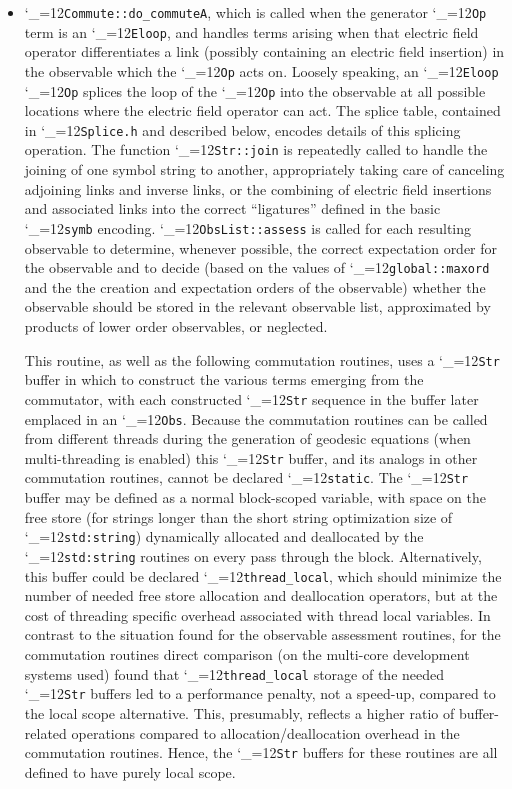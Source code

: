 \documentclass [12pt]{article}
\makeatletter
\renewcommand{\tt}{\begingroup\catcode`_=12\def\_{\string_}\tt@}
\newcommand{\tt@}[1]{\texttt{#1}\endgroup}
\makeatother
\begin{document}
\begin{itemize}
\item
    \tt{Commute::do_commuteA}, which is called when the
    generator \tt{Op} term is an \tt{Eloop}, and
    handles terms arising when that electric field operator
    differentiates a link (possibly containing an electric
    field insertion) in the
    observable which the \tt{Op} acts on.
    Loosely speaking, an \tt{Eloop} \tt{Op} splices
    the loop of the \tt{Op} into the observable at all
    possible locations where the electric field operator
    can act.
    The splice table, contained in \tt{Splice.h} and
    described below, encodes details of this splicing operation.
    The function \tt{Str::join} is repeatedly called to
    handle the joining of one symbol string to another,
    appropriately taking care of canceling adjoining links
    and inverse links, or the combining of electric
    field insertions and associated links into the
    correct ``ligatures'' defined in the basic \tt{symb} encoding.
    \tt{ObsList::assess} is called for each resulting observable
    to determine, whenever possible, the correct expectation order
    for the observable and to decide (based on the
    values of \tt{global::maxord} and the the creation and expectation
    orders of the observable) whether the observable should be stored
    in the relevant observable list, approximated by products
    of lower order observables, or neglected.

    This routine, as well as the following commutation routines,
    uses a \tt{Str} buffer in which to construct the various terms
    emerging from the commutator, with each constructed \tt{Str}
    sequence in the buffer later emplaced in an \tt{Obs}.
    Because the commutation routines can be called from different
    threads during the generation of geodesic equations
    (when multi-threading is enabled) this \tt{Str} buffer,
    and its analogs in other commutation routines,
    cannot be declared \tt{static}.
    The \tt{Str} buffer may be defined as a normal
    block-scoped variable, with space on the free store
    (for strings longer than the short string optimization
    size of \tt{std:string})
    dynamically allocated and deallocated by the
    \tt{std:string} routines on every pass through the block.
    Alternatively,
    this buffer could be declared \tt{thread_local}, which should
    minimize the number of needed free store allocation
    and deallocation operators, but at the cost of threading
    specific overhead associated with thread local variables.
    In contrast to the situation found for the observable assessment
    routines, for the commutation routines
    direct comparison (on the multi-core development systems used)
    found that \tt{thread_local} storage of the needed \tt{Str} buffers
    led to a performance penalty, not a speed-up,
    compared to the local scope alternative.
    This, presumably, reflects a
    higher ratio of buffer-related operations compared
    to allocation/deallocation overhead in the commutation routines.
    Hence, the \tt{Str} buffers for these routines
    are all defined to have purely local scope.


\end{itemize}
\end{document}
